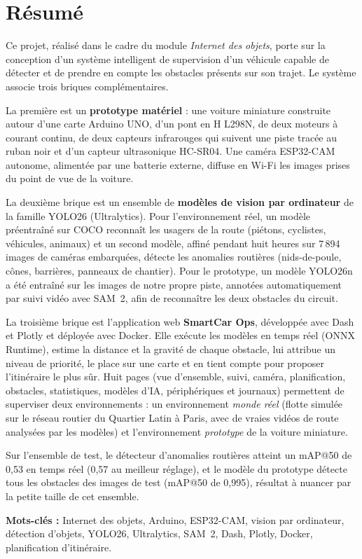\chapter*{Résumé}

Ce projet, réalisé dans le cadre du module \emph{Internet des objets}, porte sur la conception d'un système
intelligent de supervision d'un véhicule capable de détecter et de prendre en compte les obstacles présents sur
son trajet. Le système associe trois briques complémentaires.

La première est un \textbf{prototype matériel} : une voiture miniature construite autour d'une carte Arduino UNO,
d'un pont en H L298N, de deux moteurs à courant continu, de deux capteurs infrarouges qui suivent une piste
tracée au ruban noir et d'un capteur ultrasonique HC-SR04. Une caméra ESP32-CAM autonome, alimentée par une
batterie externe, diffuse en Wi-Fi les images prises du point de vue de la voiture.

La deuxième brique est un ensemble de \textbf{modèles de vision par ordinateur} de la famille YOLO26
(Ultralytics). Pour l'environnement réel, un modèle préentraîné sur COCO reconnaît les usagers de la route
(piétons, cyclistes, véhicules, animaux) et un second modèle, affiné pendant huit heures sur 7\,894 images de
caméras embarquées, détecte les anomalies routières (nids-de-poule, cônes, barrières, panneaux de chantier). Pour
le prototype, un modèle YOLO26n a été entraîné sur les images de notre propre piste, annotées automatiquement par
suivi vidéo avec SAM~2, afin de reconnaître les deux obstacles du circuit.

La troisième brique est l'application web \textbf{SmartCar Ops}, développée avec Dash et Plotly et déployée avec
Docker. Elle exécute les modèles en temps réel (ONNX Runtime), estime la distance et la gravité de chaque
obstacle, lui attribue un niveau de priorité, le place sur une carte et en tient compte pour proposer
l'itinéraire le plus sûr. Huit pages (vue d'ensemble, suivi, caméra, planification, obstacles, statistiques,
modèles d'IA, périphériques et journaux) permettent de superviser deux environnements : un environnement
\emph{monde réel} (flotte simulée sur le réseau routier du Quartier Latin à Paris, avec de vraies vidéos de route
analysées par les modèles) et l'environnement \emph{prototype} de la voiture miniature.

Sur l'ensemble de test, le détecteur d'anomalies routières atteint un mAP@50 de 0,53 en temps réel (0,57 au
meilleur réglage), et le modèle du prototype détecte tous les obstacles des images de test (mAP@50 de 0,995),
résultat à nuancer par la petite taille de cet ensemble.

\vspace{0.5cm}
\noindent\textbf{Mots-clés :} Internet des objets, Arduino, ESP32-CAM, vision par ordinateur, détection d'objets,
YOLO26, Ultralytics, SAM~2, Dash, Plotly, Docker, planification d'itinéraire.
